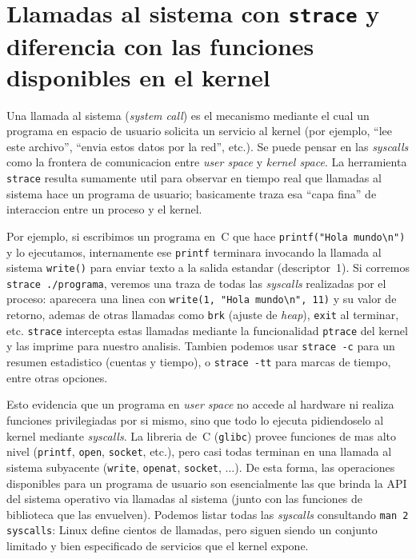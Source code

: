 \section{Llamadas al sistema con \texttt{strace} y diferencia con las funciones disponibles en el kernel}

Una llamada al sistema (\emph{system call}) es el mecanismo mediante el cual un programa en espacio de usuario solicita un servicio al kernel (por ejemplo, ``lee este archivo'', ``envia estos datos por la red'', etc.). Se puede pensar en las \emph{syscalls} como la frontera de comunicacion entre \emph{user space} y \emph{kernel space}.  
La herramienta \texttt{strace} resulta sumamente util para observar en tiempo real que llamadas al sistema hace un programa de usuario; basicamente traza esa ``capa fina'' de interaccion entre un proceso y el kernel.

Por ejemplo, si escribimos un programa en~C que hace \texttt{printf("Hola mundo\textbackslash n")} y lo ejecutamos, internamente ese \texttt{printf} terminara invocando la llamada al sistema \texttt{write()} para enviar texto a la salida estandar (descriptor~1). Si corremos \texttt{strace ./programa}, veremos una traza de todas las \emph{syscalls} realizadas por el proceso: aparecera una linea con \texttt{write(1, "Hola mundo\textbackslash n", 11)} y su valor de retorno, ademas de otras llamadas como \texttt{brk} (ajuste de \emph{heap}), \texttt{exit} al terminar, etc. \texttt{strace} intercepta estas llamadas mediante la funcionalidad \texttt{ptrace} del kernel y las imprime para nuestro analisis. Tambien podemos usar \texttt{strace -c} para un resumen estadistico (cuentas y tiempo), o \texttt{strace -tt} para marcas de tiempo, entre otras opciones.

Esto evidencia que un programa en \emph{user space} no accede al hardware ni realiza funciones privilegiadas por si mismo, sino que todo lo ejecuta pidiendoselo al kernel mediante \emph{syscalls}. La libreria de~C (\texttt{glibc}) provee funciones de mas alto nivel (\texttt{printf}, \texttt{open}, \texttt{socket}, etc.), pero casi todas terminan en una llamada al sistema subyacente (\texttt{write}, \texttt{openat}, \texttt{socket}, ...). De esta forma, las operaciones disponibles para un programa de usuario son esencialmente las que brinda la API del sistema operativo via llamadas al sistema (junto con las funciones de biblioteca que las envuelven). Podemos listar todas las \emph{syscalls} consultando \texttt{man~2 syscalls}: Linux define cientos de llamadas, pero siguen siendo un conjunto limitado y bien especificado de servicios que el kernel expone.

